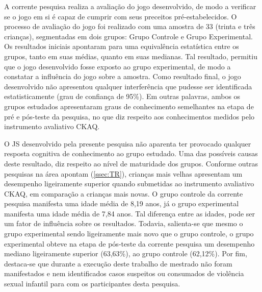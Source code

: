 A corrente pesquisa realiza a avaliação do jogo desenvolvido, de modo a verificar se o jogo em si é capaz de cumprir com seus preceitos pré-estabelecidos. O processo de avaliação do jogo foi realizado com uma amostra de 33 (trinta e três crianças), segmentadas em dois grupos: Grupo Controle e Grupo Experimental. Os resultados iniciais apontaram para uma equivalência estatística entre os grupos, tanto em suas médias, quanto em suas medianas. Tal resultado, permitiu que o jogo desenvolvido fosse exposto ao grupo experimental, de modo a constatar a influência do jogo sobre a amostra. Como resultado final, o jogo desenvolvido não apresentou qualquer interferência que pudesse ser identificada estatisticamente (grau de confiança de 95\%). Em outras palavras, ambos os grupos estudados apresentaram graus de conhecimento semelhantes na etapa de pré e pós-teste da pesquisa, no que diz respeito aos conhecimentos medidos pelo instrumento avaliativo \ac{CKAQ}.

 
O \acf{JS} desenvolvido pela presente pesquisa não aparenta ter provocado qualquer resposta cognitiva de conhecimento ao grupo estudado. Uma das possíveis causas deste resultado, diz respeito ao nível de maturidade dos grupos. Conforme outras pesquisas na área apontam (\autoref{ssec:TR}), crianças mais velhas apresentam um desempenho ligeiramente superior quando submetidas ao instrumento avaliativo \ac{CKAQ}, em comparação a crianças mais novas. O grupo controle da corrente pesquisa manifesta uma idade média de 8,19 anos, já o grupo experimental manifesta uma idade média de 7,84 anos. Tal diferença entre as idades, pode ser um fator de influência sobre os resultados. Todavia, salienta-se que mesmo o grupo experimental sendo ligeiramente mais novo que o grupo controle, o grupo experimental obteve na etapa de pós-teste da corrente pesquisa um desempenho mediano ligeiramente  superior (63,63\%), ao grupo controle (62,12\%). Por fim, destaca-se que durante a execução deste trabalho de mestrado não foram manifestados e nem identificados casos suspeitos ou consumados de violência sexual infantil para com os participantes desta pesquisa.  

